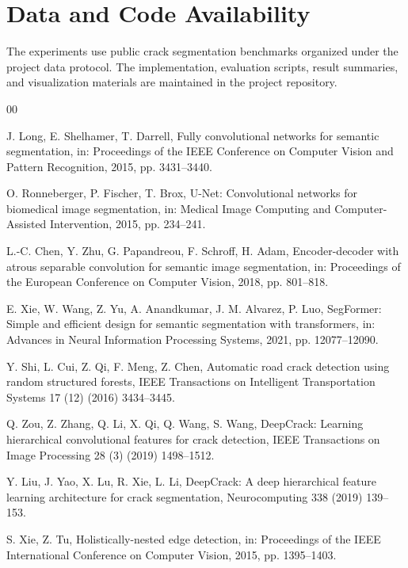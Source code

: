 \documentclass[preprint,12pt]{elsarticle}
\begin{document}
\section*{Data and Code Availability}

The experiments use public crack segmentation benchmarks organized under the project data protocol. The implementation, evaluation scripts, result summaries, and visualization materials are maintained in the project repository.

\begin{thebibliography}{00}

J. Long, E. Shelhamer, T. Darrell,
Fully convolutional networks for semantic segmentation,
in: Proceedings of the IEEE Conference on Computer Vision and Pattern Recognition, 2015, pp. 3431--3440.

O. Ronneberger, P. Fischer, T. Brox,
U-Net: Convolutional networks for biomedical image segmentation,
in: Medical Image Computing and Computer-Assisted Intervention, 2015, pp. 234--241.

L.-C. Chen, Y. Zhu, G. Papandreou, F. Schroff, H. Adam,
Encoder-decoder with atrous separable convolution for semantic image segmentation,
in: Proceedings of the European Conference on Computer Vision, 2018, pp. 801--818.

E. Xie, W. Wang, Z. Yu, A. Anandkumar, J. M. Alvarez, P. Luo,
SegFormer: Simple and efficient design for semantic segmentation with transformers,
in: Advances in Neural Information Processing Systems, 2021, pp. 12077--12090.

Y. Shi, L. Cui, Z. Qi, F. Meng, Z. Chen,
Automatic road crack detection using random structured forests,
IEEE Transactions on Intelligent Transportation Systems 17 (12) (2016) 3434--3445.

Q. Zou, Z. Zhang, Q. Li, X. Qi, Q. Wang, S. Wang,
DeepCrack: Learning hierarchical convolutional features for crack detection,
IEEE Transactions on Image Processing 28 (3) (2019) 1498--1512.

Y. Liu, J. Yao, X. Lu, R. Xie, L. Li,
DeepCrack: A deep hierarchical feature learning architecture for crack segmentation,
Neurocomputing 338 (2019) 139--153.

S. Xie, Z. Tu,
Holistically-nested edge detection,
in: Proceedings of the IEEE International Conference on Computer Vision, 2015, pp. 1395--1403.


\end{thebibliography}
\end{document}
